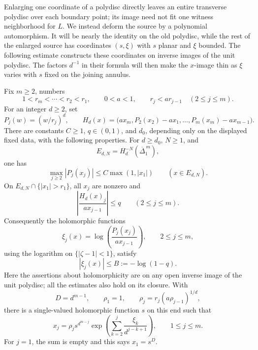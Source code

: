 Enlarging one coordinate of a polydisc directly leaves an entire
transverse polydisc over each boundary point; its image need not fit
one witness neighborhood for $L$. We instead deform the source by a
polynomial automorphism. It will be nearly the identity on the old
polydisc, while the rest of the enlarged source has coordinates
$(s,\xi)$ with $s$ planar and $\xi$ bounded. The following estimate
constructs these coordinates on inverse images of the unit polydisc.
The factors $d^{-1}$ in their formula will then make the $x$-image
thin as $\xi$ varies with $s$ fixed on the joining annulus.

\begin{lemma}\label{ana:concentration}
Fix \(m\geq2\), numbers
\[
 1<r_m<\cdots<r_2<r_1,
 \qquad 0<a<1,\qquad r_j<a r_{j-1}\quad(2\leq j\leq m).
\]
For an integer \(d\geq2\), set
\[
 P_j(w)=(w/r_j)^d,\qquad
 H_d(x)=\bigl(a x_m,P_2(x_2)-a x_1,\ldots,
                        P_m(x_m)-a x_{m-1}\bigr).
\]
There are constants \(C\geq1\), \(q\in(0,1)\), and \(d_0\), depending
only on the displayed fixed data, with the following properties.
For \(d\geq d_0\), \(N\geq1\), and
\[
 E_{d,N}=H_d^{-N}(\overline\Delta_1^{\,m}),
\]
one has
\begin{equation}\label{ana:eq:power-bound}
 \max_{j\geq2}|P_j(x_j)|\leq C\max(1,|x_1|)
 \qquad(x\in E_{d,N}).
\end{equation}
On \(E_{d,N}\cap\{|x_1|>r_1\}\), all \(x_j\) are nonzero and
\begin{equation}\label{ana:eq:ratio-bound}
 \left|\frac{H_d(x)_j}{a x_{j-1}}\right|\leq q
 \qquad(2\leq j\leq m).
\end{equation}
Consequently the holomorphic functions
\[
 \xi_j(x)=\log\left(\frac{P_j(x_j)}{a x_{j-1}}\right),
 \qquad 2\leq j\leq m,
\]
using the logarithm on \(\{|\zeta-1|<1\}\), satisfy
\[
 |\xi_j(x)|\leq B:=-\log(1-q).
\]
Here the assertions about holomorphicity are on any open inverse
image of the unit polydisc; all the estimates also hold on its
closure.  With
\[
 D=d^{m-1},\qquad
 \rho_1=1,\qquad \rho_j=r_j(a\rho_{j-1})^{1/d},
\]
there is a single-valued holomorphic function \(s\) on this end such
that
\begin{equation}\label{ana:eq:parameterization}
 x_j=\rho_j s^{d^{m-j}}
       \exp\left(\sum_{k=2}^j\frac{\xi_k}{d^{j-k+1}}\right),
 \qquad 1\leq j\leq m.
\end{equation}
For \(j=1\), the sum is empty and this says \(x_1=s^D\).
\end{lemma}

